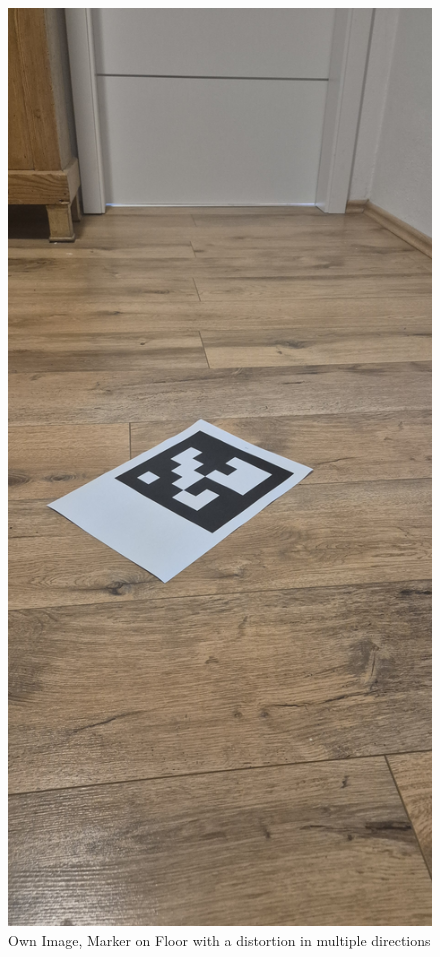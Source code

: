 \documentclass[a4paper,twocolumn]{article}
\begin{document}
\begin{figure}[htbp]
    \centering
    \includegraphics[width=\columnwidth, keepaspectratio]{newImg/20241129_153124.jpeg}
    \caption{Own Image, Marker on Floor with a distortion in multiple directions\cite{tim-schweitzer}}
    \label{fig:example-appendix1}
\end{figure}
\end{document}
